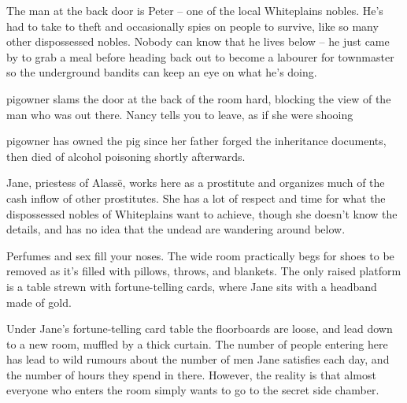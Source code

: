 \begin{multicols}{2}


The man at the back door is Peter -- one of the local Whiteplains nobles. He's had to take to theft and occasionally spies on people to survive, like so many other dispossessed nobles.  Nobody can know that he lives below -- he just came by to grab a meal before heading back out to become a labourer for \gls{townmaster} so the underground bandits can keep an eye on what he's doing.

\begin{boxtext}

	\Gls{pigowner} slams the door at the back of the room hard, blocking the view of the man who was out there.  Nancy tells you to leave, as if she were shooing 

\end{boxtext}

\pigowner

\Gls{pigowner} has owned the pig since her father forged the inheritance documents, then died of alcohol poisoning shortly afterwards.

\label{priestessjane}

Jane, priestess of Alass\"{e}, works here as a prostitute and organizes much of the cash inflow of other prostitutes.  She has a lot of respect and time for what the dispossessed nobles of Whiteplains want to achieve, though she doesn't know the details, and has no idea that the undead are wandering around below.

\begin{boxtext}

	Perfumes and sex fill your noses.  The wide room practically begs for shoes to be removed as it's filled with pillows, throws, and blankets.  The only raised platform is a table strewn with fortune-telling cards, where Jane sits with a headband made of gold.

\end{boxtext}

Under Jane's fortune-telling card table the floorboards are loose, and lead down to a new room, muffled by a thick curtain.
The number of people entering here has lead to wild rumours about the number of men Jane satisfies each day, and the number of hours they spend in there.
However, the reality is that almost everyone who enters the room simply wants to go to the secret side chamber.



\end{multicols}
